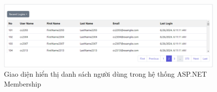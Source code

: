 \documentclass{article}[14pt]
\begin{document}
\begin{figure}
    \centering
    \includegraphics[width=0.8\linewidth]{images/list.png}
    \caption{Giao diện hiển thị danh sách người dùng trong hệ thống ASP.NET Membership}
    \label{fig:list}
\end{figure}
    
    
   
    \pagebreak 
    
    
    \nocite{*}

    
\end{document}
